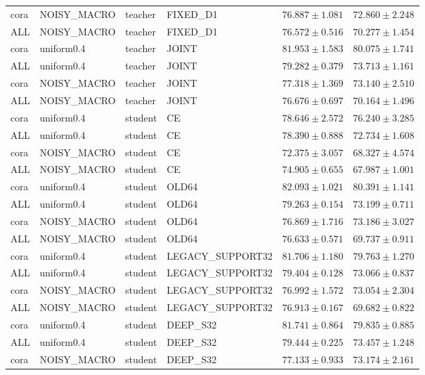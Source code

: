 \begin{longtable}{llllrr}
cora & NOISY\_MACRO & teacher & FIXED\_D1 & $76.887 \pm 1.081$ & $72.860 \pm 2.248$ \\
ALL & NOISY\_MACRO & teacher & FIXED\_D1 & $76.572 \pm 0.516$ & $70.277 \pm 1.454$ \\
cora & uniform0.4 & teacher & JOINT & $81.953 \pm 1.583$ & $80.075 \pm 1.741$ \\
ALL & uniform0.4 & teacher & JOINT & $79.282 \pm 0.379$ & $73.713 \pm 1.161$ \\
cora & NOISY\_MACRO & teacher & JOINT & $77.318 \pm 1.369$ & $73.140 \pm 2.510$ \\
ALL & NOISY\_MACRO & teacher & JOINT & $76.676 \pm 0.697$ & $70.164 \pm 1.496$ \\
cora & uniform0.4 & student & CE & $78.646 \pm 2.572$ & $76.240 \pm 3.285$ \\
ALL & uniform0.4 & student & CE & $78.390 \pm 0.888$ & $72.734 \pm 1.608$ \\
cora & NOISY\_MACRO & student & CE & $72.375 \pm 3.057$ & $68.327 \pm 4.574$ \\
ALL & NOISY\_MACRO & student & CE & $74.905 \pm 0.655$ & $67.987 \pm 1.001$ \\
cora & uniform0.4 & student & OLD64 & $82.093 \pm 1.021$ & $80.391 \pm 1.141$ \\
ALL & uniform0.4 & student & OLD64 & $79.263 \pm 0.154$ & $73.199 \pm 0.711$ \\
cora & NOISY\_MACRO & student & OLD64 & $76.869 \pm 1.716$ & $73.186 \pm 3.027$ \\
ALL & NOISY\_MACRO & student & OLD64 & $76.633 \pm 0.571$ & $69.737 \pm 0.911$ \\
cora & uniform0.4 & student & LEGACY\_SUPPORT32 & $81.706 \pm 1.180$ & $79.763 \pm 1.270$ \\
ALL & uniform0.4 & student & LEGACY\_SUPPORT32 & $79.404 \pm 0.128$ & $73.066 \pm 0.837$ \\
cora & NOISY\_MACRO & student & LEGACY\_SUPPORT32 & $76.992 \pm 1.572$ & $73.054 \pm 2.304$ \\
ALL & NOISY\_MACRO & student & LEGACY\_SUPPORT32 & $76.913 \pm 0.167$ & $69.682 \pm 0.822$ \\
cora & uniform0.4 & student & DEEP\_S32 & $81.741 \pm 0.864$ & $79.835 \pm 0.885$ \\
ALL & uniform0.4 & student & DEEP\_S32 & $79.444 \pm 0.225$ & $73.457 \pm 1.248$ \\
cora & NOISY\_MACRO & student & DEEP\_S32 & $77.133 \pm 0.933$ & $73.174 \pm 2.161$ \\

\end{longtable}

